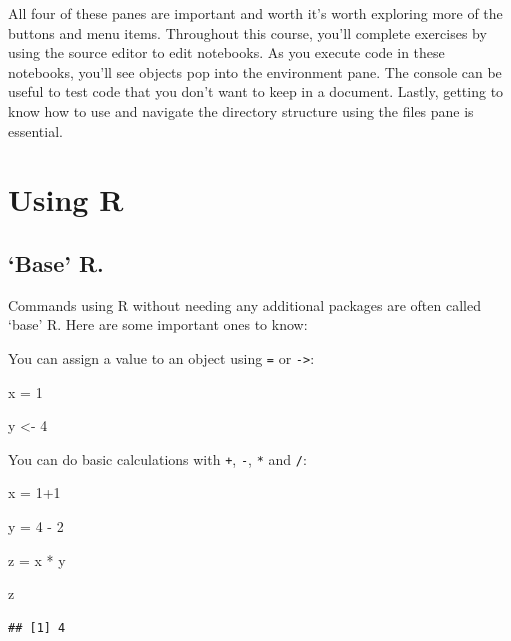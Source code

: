 \documentclass[
]{book}
\newenvironment{Shaded}{\begin{snugshade}}{\end{snugshade}}
\newcommand{\DecValTok}[1]{\textcolor[rgb]{0.00,0.00,0.81}{#1}}
\newcommand{\NormalTok}[1]{#1}
\newcommand{\OtherTok}[1]{\textcolor[rgb]{0.56,0.35,0.01}{#1}}
\newcommand{\SpecialCharTok}[1]{\textcolor[rgb]{0.00,0.00,0.00}{#1}}
\begin{document}
All four of these panes are important and worth it's worth exploring more of the buttons and menu items. Throughout this course, you'll complete exercises by using the source editor to edit notebooks. As you execute code in these notebooks, you'll see objects pop into the environment pane. The console can be useful to test code that you don't want to keep in a document. Lastly, getting to know how to use and navigate the directory structure using the files pane is essential.

\hypertarget{using-r}{%
\section{Using R}\label{using-r}}

\hypertarget{base-r.}{%
\subsection{`Base' R.}\label{base-r.}}

Commands using R without needing any additional packages are often called `base' R. Here are some important ones to know:

You can assign a value to an object using \texttt{=} or \texttt{-\textgreater{}}:

\begin{Shaded}
\begin{Highlighting}[]
\NormalTok{x }\OtherTok{=} \DecValTok{1}

\NormalTok{y }\OtherTok{\textless{}{-}} \DecValTok{4}
\end{Highlighting}
\end{Shaded}

You can do basic calculations with \texttt{+}, \texttt{-}, \texttt{*} and \texttt{/}:

\begin{Shaded}
\begin{Highlighting}[]
\NormalTok{x }\OtherTok{=} \DecValTok{1}\SpecialCharTok{+}\DecValTok{1}

\NormalTok{y }\OtherTok{=} \DecValTok{4} \SpecialCharTok{{-}} \DecValTok{2}

\NormalTok{z }\OtherTok{=}\NormalTok{ x }\SpecialCharTok{*}\NormalTok{ y}

\NormalTok{z}
\end{Highlighting}
\end{Shaded}

\begin{verbatim}
## [1] 4
\end{verbatim}
\end{document}
